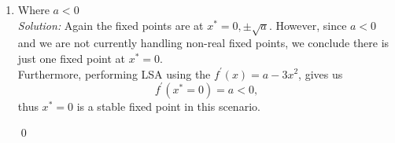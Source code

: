\documentclass[10pt]{amsart}
\theoremstyle{nonumberplain}
\begin{document}
\begin{enumerate}[label={\bf {\arabic*}:}]
\begin{enumerate}
\item Where $a < 0$ \\

\noindent
\textit{Solution:} Again the fixed points are at $x^* = 0, \pm \sqrt a$. However, since $a < 0$ and we are not currently handling non-real fixed points, we conclude there is just one fixed point at $x^* = 0$. \\

\noindent
Furthermore, performing LSA using the $f^\prime(x) = a - 3x^2$, gives us
$$f^\prime (x^* = 0) = a < 0, $$
thus $x^* = 0$ is a stable fixed point in this scenario.

\qed \\

\end{enumerate}

\end{enumerate}
\end{document}
